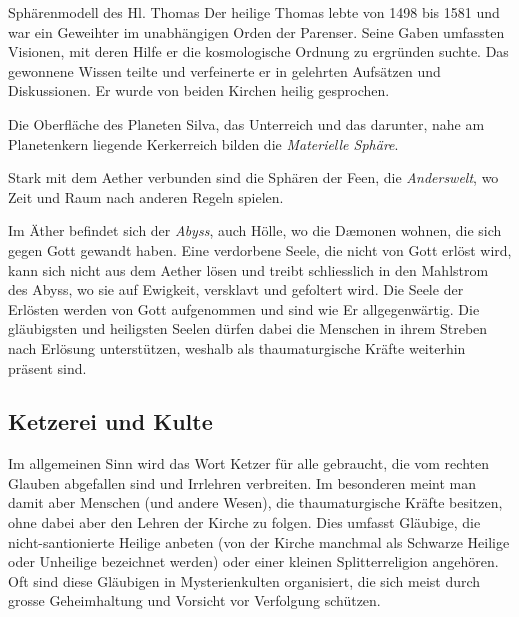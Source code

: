 \documentclass[12pt,twoside,twocolumn,openany]{book}
\begin{document}
	


	\begin{paperbox}{Sphärenmodell des Hl. Thomas}
		Der heilige Thomas lebte von 1498 bis 1581 und war ein Geweihter im unabhängigen Orden der Parenser. Seine Gaben umfassten Visionen, mit deren Hilfe er die kosmologische Ordnung zu ergründen suchte. Das gewonnene Wissen teilte und verfeinerte er in gelehrten Aufsätzen und Diskussionen. Er wurde von beiden Kirchen heilig gesprochen.
		
		Die Oberfläche des Planeten Silva, das Unterreich und das darunter, nahe am Planetenkern liegende Kerkerreich bilden die \emph{Materielle Sphäre}.
		
		Stark mit dem Aether verbunden sind die Sphären der Feen, die \emph{Anderswelt}, wo Zeit und Raum nach anderen Regeln spielen.
		
		Im Äther befindet sich der \emph{Abyss}, auch Hölle, wo die D\ae monen wohnen, die sich gegen Gott gewandt haben. Eine verdorbene Seele, die nicht von Gott erlöst wird, kann sich nicht aus dem Aether lösen und treibt schliesslich in den Mahlstrom des Abyss, wo sie auf Ewigkeit, versklavt und gefoltert wird.
		Die Seele der Erlösten werden von Gott aufgenommen und sind wie Er allgegenwärtig. Die gläubigsten und heiligsten Seelen dürfen dabei die Menschen in ihrem Streben nach Erlösung unterstützen, weshalb als thaumaturgische Kräfte weiterhin präsent sind.
	\end{paperbox}

	\subsection{Ketzerei und Kulte}

	Im allgemeinen Sinn wird das Wort Ketzer für alle gebraucht, die vom rechten Glauben abgefallen sind und Irrlehren verbreiten. Im besonderen meint man damit aber Menschen (und andere Wesen), die thaumaturgische Kräfte besitzen, ohne dabei aber den Lehren der Kirche zu folgen. Dies umfasst Gläubige, die nicht-santionierte Heilige anbeten (von der Kirche manchmal als Schwarze Heilige oder Unheilige bezeichnet werden) oder einer kleinen Splitterreligion angehören. Oft sind diese Gläubigen in Mysterienkulten organisiert, die sich meist durch grosse Geheimhaltung und Vorsicht vor Verfolgung schützen.
	
\end{document}
